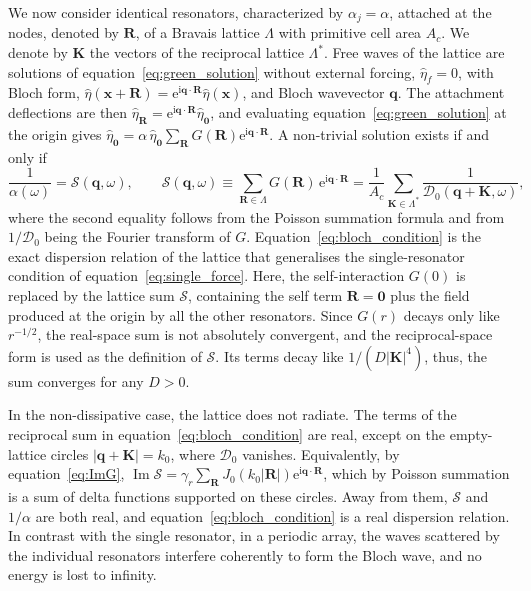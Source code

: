 We now consider identical resonators, characterized by $\alpha_j=\alpha$, attached at the nodes, denoted by $\mathbf{R}$, of a Bravais lattice $\Lambda$ with primitive cell area $A_c$. We denote by $\mathbf{K}$ the vectors of the reciprocal lattice $\Lambda^*$. Free waves of the lattice are solutions of equation~\eqref{eq:green_solution} without external forcing, $\widehat{\eta}_f=0$, with Bloch form, $\widehat{\eta}(\mathbf{x}+\mathbf{R})=\mathrm{e}^{\mathrm{i}\mathbf{q}\cdot\mathbf{R}}\widehat{\eta}(\mathbf{x})$, and Bloch wavevector $\mathbf{q}$. The attachment deflections are then $\widehat{\eta}_{\mathbf{R}}=\mathrm{e}^{\mathrm{i}\mathbf{q}\cdot\mathbf{R}}\widehat{\eta}_{\mathbf{0}}$, and evaluating equation~\eqref{eq:green_solution} at the origin gives $\widehat{\eta}_{\mathbf{0}}=\alpha\,\widehat{\eta}_{\mathbf{0}}\sum_{\mathbf{R}}G(\mathbf{R})\mathrm{e}^{\mathrm{i}\mathbf{q}\cdot\mathbf{R}}$. A non-trivial solution exists if and only if
\begin{equation}
  \label{eq:bloch_condition}
  \frac{1}{\alpha(\omega)}=\mathcal{S}(\mathbf{q},\omega),
  \qquad
  \mathcal{S}(\mathbf{q},\omega)\equiv\sum_{\mathbf{R}\in\Lambda}G(\mathbf{R})\,\mathrm{e}^{\mathrm{i}\mathbf{q}\cdot\mathbf{R}}
  =\frac{1}{A_c}\sum_{\mathbf{K}\in\Lambda^*}\frac{1}{\mathcal{D}_0(\mathbf{q}+\mathbf{K},\omega)} ,
\end{equation}
where the second equality follows from the Poisson summation formula and from $1/\mathcal{D}_0$ being the Fourier transform of $G$. Equation~\eqref{eq:bloch_condition} is the exact dispersion relation of the lattice that generalises the single-resonator condition of equation~\eqref{eq:single_force}. Here, the self-interaction $G(0)$ is replaced by the lattice sum $\mathcal{S}$, containing the self term $\mathbf{R}=\mathbf{0}$ plus the field produced at the origin by all the other resonators. Since $G(r)$ decays only like $r^{-1/2}$, the real-space sum is not absolutely convergent, and the reciprocal-space form is used as the definition of $\mathcal{S}$. Its terms decay like $1/(D|\mathbf{K}|^4)$, thus, the sum converges for any $D>0$.

In the non-dissipative case, the lattice does not radiate. The terms of the reciprocal sum in equation~\eqref{eq:bloch_condition} are real, except on the empty-lattice circles $|\mathbf{q}+\mathbf{K}|=k_0$, where $\mathcal{D}_0$ vanishes. Equivalently, by equation~\eqref{eq:ImG}, $\operatorname{Im}\mathcal{S}=\gamma_r\sum_{\mathbf{R}}J_0(k_0|\mathbf{R}|)\mathrm{e}^{\mathrm{i}\mathbf{q}\cdot\mathbf{R}}$, which by Poisson summation is a sum of delta functions supported on these circles. Away from them, $\mathcal{S}$ and $1/\alpha$ are both real, and equation~\eqref{eq:bloch_condition} is a real dispersion relation. In contrast with the single resonator, in a periodic array, the waves scattered by the individual resonators interfere coherently to form the Bloch wave, and no energy is lost to infinity.

